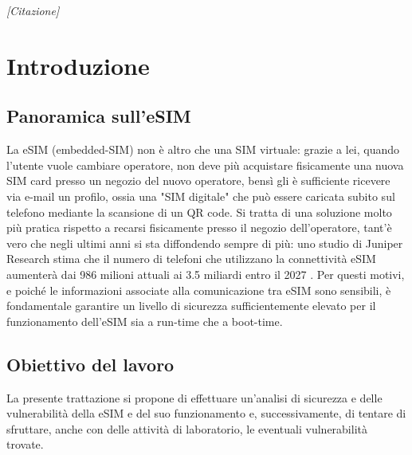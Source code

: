\documentclass[10pt, twoside, openany]{book}
\begin{document}
\begin{frontespizio}
\end{frontespizio}

\begin{flushright}
\null{}
\textit{[Citazione]}
\null
\end{flushright}

\tableofcontents
\listoffigures
\listoftables

\chapter{Introduzione}
\section{Panoramica sull'eSIM}
La eSIM (embedded-SIM) non è altro che una SIM virtuale: grazie a lei, quando l'utente vuole cambiare operatore, non deve più acquistare fisicamente una nuova SIM card presso un negozio del nuovo operatore, bensì gli è sufficiente ricevere via e-mail un profilo, ossia una "SIM digitale" che può essere caricata subito sul telefono mediante la scansione di un QR code. Si tratta di una soluzione molto più pratica rispetto a recarsi fisicamente presso il negozio dell'operatore, tant'è vero che negli ultimi anni si sta diffondendo sempre di più: uno studio di Juniper Research stima che il numero di telefoni che utilizzano la connettività eSIM aumenterà dai 986 milioni attuali ai 3.5 miliardi entro il 2027 \cite{Corcom}. Per questi motivi, e poiché le informazioni associate alla comunicazione tra eSIM sono sensibili, è fondamentale garantire un livello di sicurezza sufficientemente elevato per il funzionamento dell'eSIM sia a run-time che a boot-time.

\section{Obiettivo del lavoro}
La presente trattazione si propone di effettuare un'analisi di sicurezza e delle vulnerabilità della eSIM e del suo funzionamento e, successivamente, di tentare di sfruttare, anche con delle attività di laboratorio, le eventuali vulnerabilità trovate.
\end{document}
